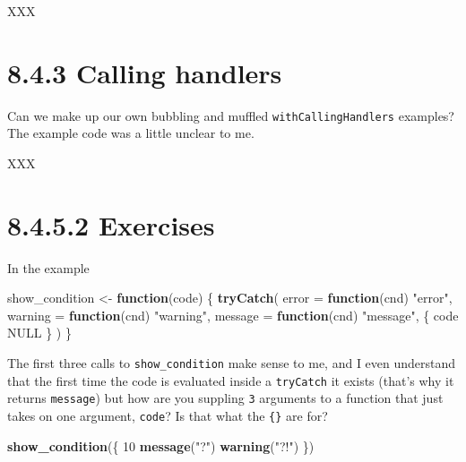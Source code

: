 \documentclass[]{book}
\newenvironment{Shaded}{\begin{snugshade}}{\end{snugshade}}
\newcommand{\ControlFlowTok}[1]{\textcolor[rgb]{0.13,0.29,0.53}{\textbf{#1}}}
\newcommand{\DataTypeTok}[1]{\textcolor[rgb]{0.13,0.29,0.53}{#1}}
\newcommand{\DecValTok}[1]{\textcolor[rgb]{0.00,0.00,0.81}{#1}}
\newcommand{\KeywordTok}[1]{\textcolor[rgb]{0.13,0.29,0.53}{\textbf{#1}}}
\newcommand{\NormalTok}[1]{#1}
\newcommand{\OtherTok}[1]{\textcolor[rgb]{0.56,0.35,0.01}{#1}}
\newcommand{\StringTok}[1]{\textcolor[rgb]{0.31,0.60,0.02}{#1}}
\begin{document}
XXX

\hypertarget{calling-handlers}{%
\section*{8.4.3 Calling handlers}\label{calling-handlers}}

Can we make up our own bubbling and muffled \texttt{withCallingHandlers} examples? The example code was a little unclear to me.

XXX

\hypertarget{exercises-4}{%
\section*{8.4.5.2 Exercises}\label{exercises-4}}

In the example

\begin{Shaded}
\begin{Highlighting}[]
\NormalTok{show_condition <-}\StringTok{ }\ControlFlowTok{function}\NormalTok{(code) \{}
  \KeywordTok{tryCatch}\NormalTok{(}
    \DataTypeTok{error =} \ControlFlowTok{function}\NormalTok{(cnd) }\StringTok{"error"}\NormalTok{,}
    \DataTypeTok{warning =} \ControlFlowTok{function}\NormalTok{(cnd) }\StringTok{"warning"}\NormalTok{,}
    \DataTypeTok{message =} \ControlFlowTok{function}\NormalTok{(cnd) }\StringTok{"message"}\NormalTok{,}
\NormalTok{    \{}
\NormalTok{      code}
      \OtherTok{NULL}
\NormalTok{    \}}
\NormalTok{  )}
\NormalTok{\}}
\end{Highlighting}
\end{Shaded}

The first three calls to \texttt{show\_condition} make sense to me, and I even understand that the first time the code is evaluated inside a \texttt{tryCatch} it exists (that's why it returns \texttt{message}) but how are you suppling \texttt{3} arguments to a function that just takes on one argument, \texttt{code}? Is that what the \texttt{\{\}} are for?

\begin{Shaded}
\begin{Highlighting}[]
\KeywordTok{show_condition}\NormalTok{(\{}
  \DecValTok{10}
  \KeywordTok{message}\NormalTok{(}\StringTok{"?"}\NormalTok{)}
  \KeywordTok{warning}\NormalTok{(}\StringTok{"?!"}\NormalTok{)}
\NormalTok{\})}
\end{Highlighting}
\end{Shaded}
\end{document}
